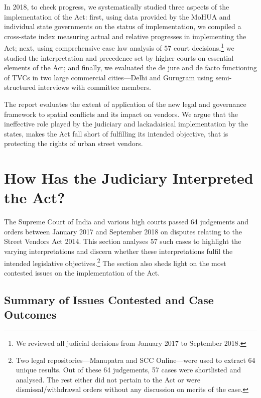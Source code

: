 \documentclass[a4paper, 12pt, twoside, table]{article}
\begin{document}
{In 2018, to check progress, we systematically studied three aspects of the implementation of the Act: first, using data provided by the MoHUA and individual state governments on the status of implementation, we compiled a cross-state index measuring actual and relative progresses in implementing the Act; next, using comprehensive case law analysis of 57 court decisions,\footnote{ We reviewed all judicial decisions from January 2017 to September 2018.} we studied the interpretation and precedence set by higher courts on essential elements of the Act; and finally, we evaluated the de jure and de facto functioning of TVCs in two large commercial cities—Delhi and Gurugram using semi-structured interviews with committee members. 

The report evaluates the extent of application of the new legal and governance framework to spatial conflicts and its impact on vendors. We argue that the ineffective role played by the judiciary and lackadaisical implementation by the states, makes the Act fall short of fulfilling its intended objective, that is protecting the rights of urban street vendors. 

\section*{How Has the Judiciary Interpreted the Act?}

The Supreme Court of India and various high courts passed 64 judgements and orders between January 2017 and September 2018 on disputes relating to the Street Vendors Act 2014. This section analyses 57 such cases to highlight the varying interpretations and discern whether these interpretations fulfil the intended legislative objectives.\footnote{ Two legal repositories—Manupatra and SCC Online—were used to extract 64 unique results. Out of these 64 judgements, 57 cases were shortlisted and analysed. The rest either did not pertain to the Act or were dismissal/withdrawal orders without any discussion on merits of the case.} The section also sheds light on the most contested issues on the implementation of the Act. 

\subsection*{Summary of Issues Contested and Case Outcomes}

}
\end{document}
